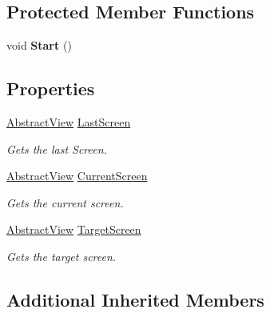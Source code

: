 \subsection*{Protected Member Functions}
\begin{DoxyCompactItemize}
\item 
\hypertarget{class_scaffolding_1_1_view_manager_a20eef73a9db449ba636716b8381ea282}{void {\bfseries Start} ()}\label{class_scaffolding_1_1_view_manager_a20eef73a9db449ba636716b8381ea282}

\end{DoxyCompactItemize}
\subsection*{Properties}
\begin{DoxyCompactItemize}
\item 
\hyperlink{class_scaffolding_1_1_abstract_view}{Abstract\+View} \hyperlink{class_scaffolding_1_1_view_manager_ac4d88a4e3c77abab903d16959b45cdae}{Last\+Screen}
\begin{DoxyCompactList}\small\item\em Gets the last Screen. \end{DoxyCompactList}\item 
\hyperlink{class_scaffolding_1_1_abstract_view}{Abstract\+View} \hyperlink{class_scaffolding_1_1_view_manager_aeba5a2db8a3551991c2be765ee700dbd}{Current\+Screen}
\begin{DoxyCompactList}\small\item\em Gets the current screen. \end{DoxyCompactList}\item 
\hyperlink{class_scaffolding_1_1_abstract_view}{Abstract\+View} \hyperlink{class_scaffolding_1_1_view_manager_ad77b108adca50eb2af05eb2dbbe13701}{Target\+Screen}
\begin{DoxyCompactList}\small\item\em Gets the target screen. \end{DoxyCompactList}\end{DoxyCompactItemize}
\subsection*{Additional Inherited Members}


